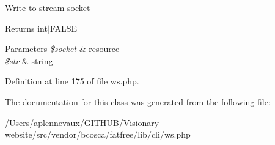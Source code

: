 Write to stream socket \begin{DoxyReturn}{Returns}
int$\vert$\+F\+A\+L\+SE 
\end{DoxyReturn}

\begin{DoxyParams}{Parameters}
{\em \$socket} & resource \\
\hline
{\em \$str} & string \\
\hline
\end{DoxyParams}


Definition at line 175 of file ws.\+php.



The documentation for this class was generated from the following file\+:\begin{DoxyCompactItemize}
\item 
/\+Users/aplennevaux/\+G\+I\+T\+H\+U\+B/\+Visionary-\/website/src/vendor/bcosca/fatfree/lib/cli/ws.\+php\end{DoxyCompactItemize}
